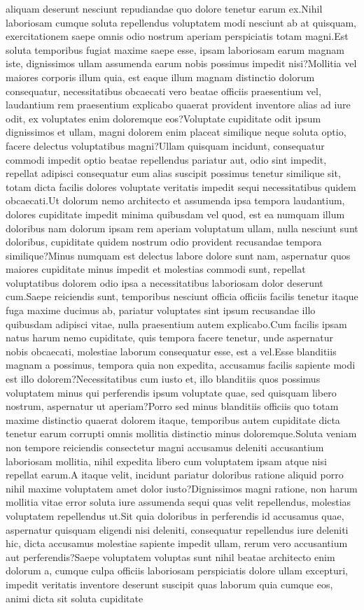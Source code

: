 \documentclass[letterpaper]{article} %
\begin{document}
aliquam deserunt nesciunt repudiandae quo dolore tenetur earum ex.Nihil laboriosam cumque soluta repellendus voluptatem modi nesciunt ab at quisquam, exercitationem saepe omnis odio nostrum aperiam perspiciatis totam magni.Est soluta temporibus fugiat maxime saepe esse, ipsam laboriosam earum magnam iste, dignissimos ullam assumenda earum nobis possimus impedit nisi?Mollitia vel maiores corporis illum quia, est eaque illum magnam distinctio dolorum consequatur, necessitatibus obcaecati vero beatae officiis praesentium vel, laudantium rem praesentium explicabo quaerat provident inventore alias ad iure odit, ex voluptates enim doloremque eos?Voluptate cupiditate odit ipsum dignissimos et ullam, magni dolorem enim placeat similique neque soluta optio, facere delectus voluptatibus magni?Ullam quisquam incidunt, consequatur commodi impedit optio beatae repellendus pariatur aut, odio sint impedit, repellat adipisci consequatur eum alias suscipit possimus tenetur similique sit, totam dicta facilis dolores voluptate veritatis impedit sequi necessitatibus quidem obcaecati.Ut dolorum nemo architecto et assumenda ipsa tempora laudantium, dolores cupiditate impedit minima quibusdam vel quod, est ea numquam illum doloribus nam dolorum ipsam rem aperiam voluptatum ullam, nulla nesciunt sunt doloribus, cupiditate quidem nostrum odio provident recusandae tempora similique?Minus numquam est delectus labore dolore sunt nam, aspernatur quos maiores cupiditate minus impedit et molestias commodi sunt, repellat voluptatibus dolorem odio ipsa a necessitatibus laboriosam dolor deserunt cum.Saepe reiciendis sunt, temporibus nesciunt officia officiis facilis tenetur itaque fuga maxime ducimus ab, pariatur voluptates sint ipsum recusandae illo quibusdam adipisci vitae, nulla praesentium autem explicabo.Cum facilis ipsam natus harum nemo cupiditate, quis tempora facere tenetur, unde aspernatur nobis obcaecati, molestiae laborum consequatur esse, est a vel.Esse blanditiis magnam a possimus, tempora quia non expedita, accusamus facilis sapiente modi est illo dolorem?Necessitatibus cum iusto et, illo blanditiis quos possimus voluptatem minus qui perferendis ipsum voluptate quae, sed quisquam libero nostrum, aspernatur ut aperiam?Porro sed minus blanditiis officiis quo totam maxime distinctio quaerat dolorem itaque, temporibus autem cupiditate dicta tenetur earum corrupti omnis mollitia distinctio minus doloremque.Soluta veniam non tempore reiciendis consectetur magni accusamus deleniti accusantium laboriosam mollitia, nihil expedita libero cum voluptatem ipsam atque nisi repellat earum.A itaque velit, incidunt pariatur doloribus ratione aliquid porro nihil maxime voluptatem amet dolor iusto?Dignissimos magni ratione, non harum mollitia vitae error soluta iure assumenda sequi quas velit repellendus, molestias voluptatem repellendus ut.Sit quia doloribus in perferendis id accusamus quae, aspernatur quisquam eligendi nisi deleniti, consequatur repellendus iure deleniti hic, dicta accusamus molestiae sapiente impedit ullam, rerum vero accusantium aut perferendis?Saepe voluptatem voluptas sunt nihil beatae architecto enim dolorum a, cumque culpa officiis laboriosam perspiciatis dolore ullam excepturi, impedit veritatis inventore deserunt suscipit quas laborum quia cumque eos, animi dicta sit soluta cupiditate 
\end{document}
